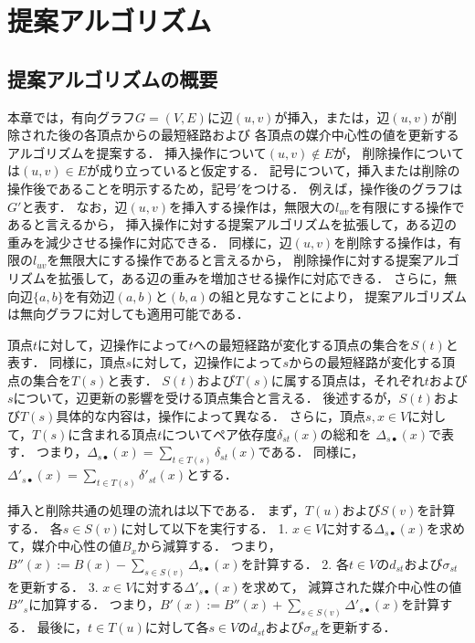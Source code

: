 \chapter{提案アルゴリズム}
\label{chap:algorithm}

\section{提案アルゴリズムの概要}

本章では，有向グラフ$G=(V,E)$に辺$(u,v)$が挿入，または，辺$(u,v)$が削除された後の各頂点からの最短経路および
各頂点の媒介中心性の値を更新するアルゴリズムを提案する．
挿入操作について$(u,v)\notin E$が，
削除操作については$(u,v)\in E$が成り立っていると仮定する．
記号について，挿入または削除の操作後であることを明示するため，記号$'$をつける．
例えば，操作後のグラフは$G'$と表す．
なお，辺$(u,v)$を挿入する操作は，無限大の$l_{uv}$を有限にする操作であると言えるから，
挿入操作に対する提案アルゴリズムを拡張して，ある辺の重みを減少させる操作に対応できる．
同様に，辺$(u,v)$を削除する操作は，有限の$l_{uv}$を無限大にする操作であると言えるから，
削除操作に対する提案アルゴリズムを拡張して，ある辺の重みを増加させる操作に対応できる．
さらに，無向辺$\{a,b\}$を有効辺$(a,b)$と$(b,a)$の組と見なすことにより，
提案アルゴリズムは無向グラフに対しても適用可能である．

頂点$t$に対して，辺操作によって$t$への最短経路が変化する頂点の集合を$S(t)$と表す．
同様に，頂点$s$に対して，辺操作によって$s$からの最短経路が変化する頂点の集合を$T(s)$と表す．
$S(t)$および$T(s)$に属する頂点は，それぞれ$t$および$s$について，辺更新の影響を受ける頂点集合と言える．
後述するが，$S(t)$および$T(s)$具体的な内容は，操作によって異なる．
さらに，頂点$s,x\in V$に対して，$T(s)$に含まれる頂点$t$についてペア依存度$\delta_{st}(x)$の総和を
$\Delta_{s\bullet}(x)$で表す\cite{Bergamini2017}．
つまり，$\Delta_{s\bullet}(x)=\sum_{t\in T(s)}\delta_{st}(x)$である．
同様に，$\Delta'_{s\bullet}(x)=\sum_{t\in T(s)}\delta'_{st}(x)$とする．

挿入と削除共通の処理の流れは以下である．
まず，$T(u)$および$S(v)$を計算する．
各$s\in S(v)$に対して以下を実行する．
1. $x\in V$に対する$\Delta_{s\bullet}(x)$を求めて，媒介中心性の値$B_x$から減算する．
つまり，$B''(x):=B(x)-\sum_{s\in S(v)}\Delta_{s\bullet}(x)$を計算する．
2. 各$t\in V$の$d_{st}$および$\sigma_{st}$を更新する．
3. $x\in V$に対する$\Delta'_{s\bullet}(x)$を求めて，
減算された媒介中心性の値$B''_s$に加算する．
つまり，$B'(x):=B''(x)+\sum_{s\in S(v)}\Delta'_{s\bullet}(x)$を計算する．
最後に，$t\in T(u)$に対して各$s\in V$の$d_{st}$および$\sigma_{st}$を更新する．

